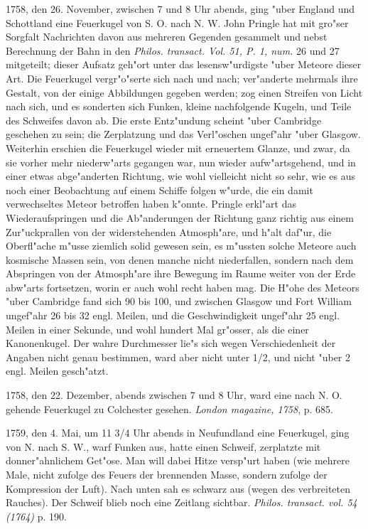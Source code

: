 \documentclass[a4paper, 11pt, oneside, polutonikogreek, german]{article}
\begin{document}
1758, den 26. November, zwischen 7 und 8 Uhr abends, ging "uber England und Schottland eine Feuerkugel von S. O. nach N. W. John Pringle hat mit gro"ser Sorgfalt Nachrichten davon aus mehreren Gegenden gesammelt und nebst Berechnung der Bahn in den \emph{Philos. transact. Vol. 51, P. 1, num.} 26 und 27 mitgeteilt; dieser Aufsatz geh"ort unter das lesensw"urdigste "uber Meteore dieser Art. Die Feuerkugel vergr"o"serte sich nach und nach; ver"anderte mehrmals ihre Gestalt, von der einige Abbildungen gegeben werden; zog einen Streifen von Licht nach sich, und es sonderten sich Funken, kleine nachfolgende Kugeln, und Teile des Schweifes davon ab. Die erste Entz"undung scheint "uber Cambridge geschehen zu sein; die Zerplatzung und das Verl"oschen ungef"ahr "uber Glasgow. Weiterhin erschien die Feuerkugel wieder mit erneuertem Glanze, und zwar, da sie vorher mehr niederw"arts gegangen war, nun wieder aufw"artsgehend, und in einer etwas abge"anderten Richtung, wie wohl vielleicht nicht so sehr, wie es aus noch einer Beobachtung auf einem Schiffe folgen w"urde, die ein damit verwechseltes Meteor betroffen haben k"onnte. Pringle erkl"art das Wiederaufspringen und die Ab"anderungen der Richtung ganz richtig aus einem Zur"uckprallen von der widerstehenden Atmosph"are, und h"alt daf"ur, die Oberfl"ache m"usse ziemlich solid gewesen sein, es m"ussten solche Meteore auch kosmische Massen sein, von denen manche nicht niederfallen, sondern nach dem Abspringen von der Atmosph"are ihre Bewegung im Raume weiter von der Erde abw"arts fortsetzen, worin er auch wohl recht haben mag. Die H"ohe des Meteors "uber Cambridge fand sich 90 bis 100, und zwischen Glasgow und Fort William ungef"ahr 26 bis 32 engl. Meilen, und die Geschwindigkeit ungef"ahr 25 engl. Meilen in einer Sekunde, und wohl hundert Mal gr"osser, als die einer Kanonenkugel. Der wahre Durchmesser lie"s sich wegen Verschiedenheit der Angaben nicht genau bestimmen, ward aber nicht unter 1/2, und nicht "uber 2 engl. Meilen gesch"atzt.

1758, den 22. Dezember, abends zwischen 7 und 8 Uhr, ward eine nach N. O. gehende Feuerkugel zu Colchester gesehen. \emph{London magazine, 1758}, p. 685.

1759, den 4. Mai, um 11 3/4 Uhr abends in Neufundland eine Feuerkugel, ging von N. nach S. W., warf Funken aus, hatte einen Schweif, zerplatzte mit donner"ahnlichem Get"ose. Man will dabei Hitze versp"urt haben (wie mehrere Male, nicht zufolge des Feuers der brennenden Masse, sondern zufolge der Kompression der Luft). Nach unten sah es schwarz aus (wegen des verbreiteten Rauches). Der Schweif blieb noch eine Zeitlang sichtbar. \emph{Philos. transact. vol. 54 (1764)} p. 190.
\end{document}
